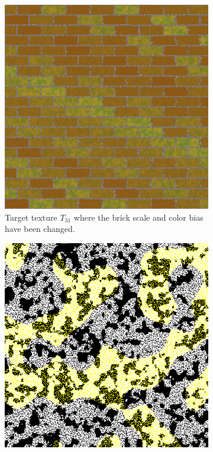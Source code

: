 \begin{figure}[!h]
\centering
\begin{subfigure}[t]{.25\textwidth}
    \centering
    \includegraphics[width=\linewidth]{img/evaluation/adv_brick_target_scale=5,color_bias=1.png}
    \caption{Target texture $T_ {31}$ where the brick scale and color bias have been changed.}
    \label{fig:TargetM3T31TwoParam}
\end{subfigure}\hspace{0.7cm}
\begin{subfigure}[t]{.25\textwidth}
    \centering
    \includegraphics[width=\linewidth]{img/evaluation/adv_brick_random_target.png}

\end{subfigure}
\end{figure}
